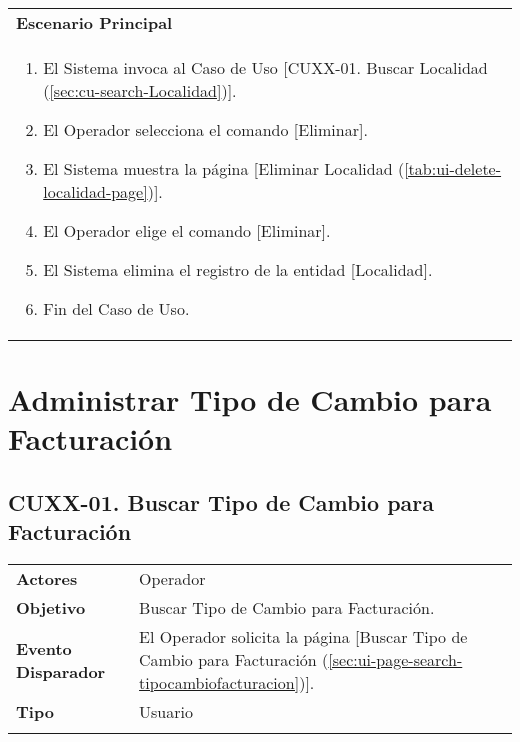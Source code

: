 \begin{tabular}{ p{15.5cm} }
	\textbf{Escenario Principal} \\
	\begin{enumerate}
		\item El Sistema invoca al Caso de Uso [CUXX-01. Buscar Localidad (\ref{sec:cu-search-Localidad})].
		\item El Operador selecciona el comando [Eliminar].
		\item El Sistema muestra la página [Eliminar Localidad (\ref{tab:ui-delete-localidad-page})].
		\item El Operador elige el comando [Eliminar].
		\item El Sistema elimina el registro de la entidad [Localidad].
		\item Fin del Caso de Uso.
	\end{enumerate}
\end{tabular}

\clearpage
\section{Administrar Tipo de Cambio para Facturación} \label{sec:cf-uc-admin-tipocambiofacturacion}

\subsection{CUXX-01. Buscar Tipo de Cambio para Facturación} \label{sec:cu-search-TipoCambioFacturacion}

\begin{tabular}{ p{3.5cm} p{11.5cm} }
	\textbf{Actores} & Operador\\
	\textbf{Objetivo} & Buscar Tipo de Cambio para Facturación.\\
	\textbf{Evento Disparador} & El Operador solicita la página [Buscar Tipo de Cambio para Facturación (\ref{sec:ui-page-search-tipocambiofacturacion})].\\
	\textbf{Tipo} & Usuario\\
	\\
\end{tabular}

